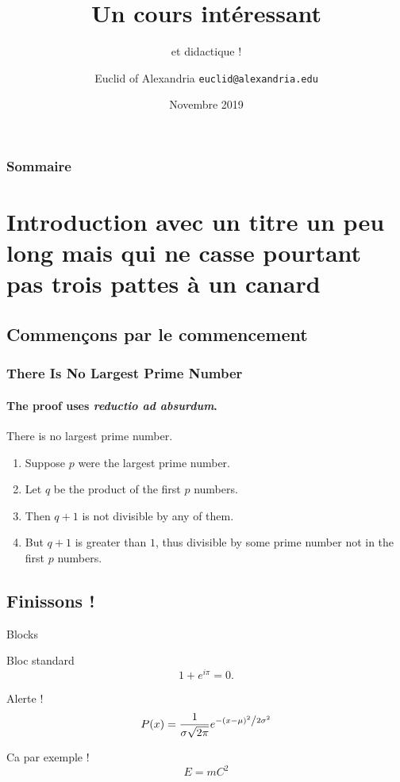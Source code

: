\documentclass[10pt]{beamer}
\title{Un cours intéressant}
\subtitle{et didactique !}
\date[2019]{Novembre 2019}
\author[Euclid]{Euclid of Alexandria \texttt{euclid@alexandria.edu}}
\institute{Département mathématique d'Alexandrie}
\begin{document}
\begin{frame}[plain]
\titlepage
\end{frame}

\begin{frame}
        \frametitle{Sommaire}
        \tableofcontents
\end{frame}


\section{Introduction avec un titre un peu long mais qui ne casse pourtant pas trois pattes à un canard}

\subsection{Commençons par le commencement}

\begin{frame} 
\frametitle{There Is No Largest Prime Number} 
\framesubtitle{The proof uses \textit{reductio ad absurdum}.} 
\begin{theorem}
	There is no largest prime number. \end{theorem} 
\begin{enumerate} 
	\item<1-| alert@1> Suppose $p$ were the largest prime number. 
	\item<2-> Let $q$ be the product of the first $p$ numbers. 
	\item<3-> Then $q+1$ is not divisible by any of them. 
	\item<1-> But $q + 1$ is greater than $1$, thus divisible by some prime
	number not in the first $p$ numbers.
\end{enumerate}
\end{frame}

\subsection{Finissons !}

\begin{frame}{Blocks}

\begin{block}{Bloc standard}
  $$1 + e^{i \pi} = 0.$$
\end{block}

\begin{alertblock}{Alerte !}
$$P(x) = \frac{1}{{\sigma \sqrt {2\pi } }}e^{{{ - \left( {x - \mu } \right)^2 } \mathord{\left/ {\vphantom {{ - \left( {x - \mu } \right)^2 } {2\sigma ^2 }}} \right. \kern-\nulldelimiterspace} {2\sigma ^2 }}}$$
\end{alertblock}
\begin{exampleblock}{Ca par exemple !}
  $$E = m C^2$$
\end{exampleblock}

\end{frame}
\end{document}
